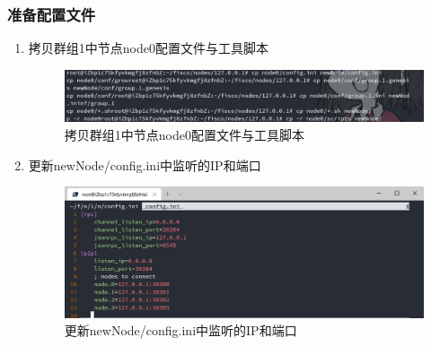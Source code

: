 \documentclass[a4paper, 11pt]{article}
\begin{document}
\subsubsection{准备配置文件}
\begin{enumerate}
      \item 拷贝群组1中节点node0配置文件与工具脚本
      \begin{figure}[H]
            \centering
            \includegraphics[width = 0.8 \textwidth]{cpnode0.png}
            \caption{拷贝群组1中节点node0配置文件与工具脚本}
      \end{figure}

      \item 更新newNode/config.ini中监听的IP和端口
      \begin{figure}[H]
            \centering
            \includegraphics[width = 0.8 \textwidth]{config.png}
            \caption{更新newNode/config.ini中监听的IP和端口}
      \end{figure}


\end{enumerate}
\end{document}
